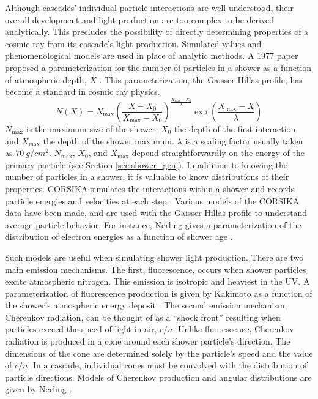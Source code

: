 Although cascades' individual particle interactions are well understood, their overall development and light production are too complex to be derived analytically. This precludes the possibility of directly determining properties of a cosmic ray from its cascade's light production. Simulated values and phenomenological models are used in place of analytic methods. A 1977 paper proposed a parameterization for the number of particles in a shower as a function of atmospheric depth, $X$ \cite{gaisser1977profile}. This parameterization, the Gaisser-Hillas profile, has become a standard in cosmic ray physics.
\begin{equation} \label{eq:gaisser_hillas}
    N(X) = N_\text{max} \left(\frac{X - X_0}{X_\text{max} - X_0}\right)
        ^{\frac{X_\text{max} - X_0}{\lambda}} 
        \exp{\left(\frac{X_\text{max} - X}{\lambda}\right)}
\end{equation}
$N_\text{max}$ is the maximum size of the shower, $X_0$ the depth of the first interaction, and $X_\text{max}$ the depth of the shower maximum. $\lambda$ is a scaling factor usually taken as $\SI{70}{g/cm^2}$. $N_\text{max}$, $X_0$, and $X_\text{max}$ depend straightforwardly on the energy of the primary particle (see Section \ref{sec:shower_gen}). In addition to knowing the number of particles in a shower, it is valuable to know distributions of their properties. CORSIKA simulates the interactions within a shower and records particle energies and velocities at each step \cite{heck1998corsika}. Various models of the CORSIKA data have been made, and are used with the Gaisser-Hillas profile to understand average particle behavior. For instance, Nerling gives a parameterization of the distribution of electron energies as a function of shower age \cite{nerling2006electron}.

Such models are useful when simulating shower light production. There are two main emission mechanisms. The first, fluorescence, occurs when shower particles excite atmospheric nitrogen. This emission is isotropic and heaviest in the UV. A parameterization of fluorescence production is given by Kakimoto as a function of the shower's atmospheric energy deposit \cite{kakimoto1996yield}. The second emission mechanism, Cherenkov radiation, can be thought of as a ``shock front'' resulting when particles exceed the speed of light in air, $c / n$. Unlike fluorescence, Cherenkov radiation is produced in a cone around each shower particle's direction. The dimensions of the cone are determined solely by the particle's speed and the value of $c / n$. In a cascade, individual cones must be convolved with the distribution of particle directions. Models of Cherenkov production and angular distributions are given by Nerling \cite{nerling2006electron}.

